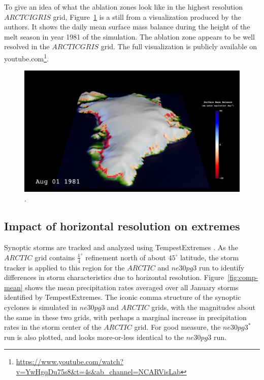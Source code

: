 \documentclass[draft]{agujournal2019}
\begin{document}
To give an idea of what the ablation zones look like in the highest resolution $ARCTCIGRIS$ grid, Figure~\ref{fig:viz} is a still from a visualization produced by the authors. It shows the daily mean surface mass balance during the height of the melt season in year 1981 of the simulation. The ablation zone appears to be well resolved in the $ARCTICGRIS$ grid. The full visualization is publicly available on youtube.com\footnote{\url{https://www.youtube.com/watch?v=YwHgqDu75s8&t=4s&ab_channel=NCARVisLab}}.

\begin{figure}[t]
\begin{center}
         \includegraphics[width=130mm]{figs/Vis1923.jpg}
\end{center}
\caption{.}
\label{fig:viz}
\end{figure}

\subsection{Impact of horizontal resolution on extremes}

Synoptic storms are tracked and analyzed using TempestExtremes \cite{UETAL2021}. As the $ARCTIC$ grid contains $\frac{1}{4}^{\circ}$ refinement north of about $45^{\circ}$ latitude, the storm tracker is applied to this region for the $ARCTIC$ and $ne30pg3$ run to identify differences in storm characteristics due to horizontal resolution. Figure~\ref{fig:comp-mean} shows the mean precipitation rates averaged over all January storms identified by TempestExtremes. The iconic comma structure of the synoptic cyclones is simulated in $ne30pg3$ and $ARCTIC$ grids, with the magnitudes about the same in these two grids, with perhaps a marginal increase in precipitation rates in the storm center of the $ARCTIC$ grid. For good measure, the $ne30pg3^{*}$ run is also plotted, and looks more-or-less identical to the $ne30pg3$ run.
\end{document}
